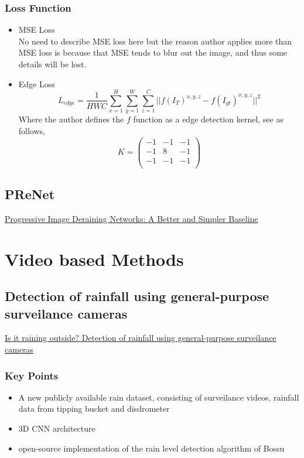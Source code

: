 \documentclass{article}
\begin{document}
\subsubsection{Loss Function}
\begin{itemize}
\item MSE Loss \bigskip \\
No need to describe MSE loss here but the reason author applies more than MSE loss is because that MSE tends to blur out the image, and thus some details will be lost.
\item Edge Loss\\ \smallskip
\begin{equation}
L_{edge}=\frac{1}{HWC} \sum_{x=1}^{H} \sum_{y=1}^{W} \sum_{z=1}^{C} \vert \vert f(I_T)^{x,y,z}-f(I_{gt})^{x,y,z} \vert \vert^2
\end{equation}
Where the author defines the $f$ function as a edge detection kernel, see as follows,
\begin{equation}
K=
\begin{pmatrix}
-1 & -1 & -1 \\
-1 &  8 & -1  \\
-1 & -1 & -1   \\
\end{pmatrix}
\end{equation}

\end{itemize}

\subsection{PReNet}
\href{https://csdwren.github.io/papers/PReNet_cvpr_camera.pdf}{Progressive Image Deraining Networks: A Better and Simpler Baseline}


\section{Video based Methods}
\subsection{Detection of rainfall using general-purpose surveilance cameras}
\href{Haurum_Is_it_Raining_Outside__Detection_of_Rainfall_using_General_Purpose}{Is it raining outside? Detection of rainfall using general-purpose surveilance cameras}

\subsubsection{Key Points}
\begin{itemize}
\item A new publicly available rain dataset, consisting of surveilance videos, rainfall data from tipping bucket and disdrometer
\item 3D CNN architecture
\item open-source implementation of the rain level detection algorithm of Bossu
\end{itemize}
\end{document}
